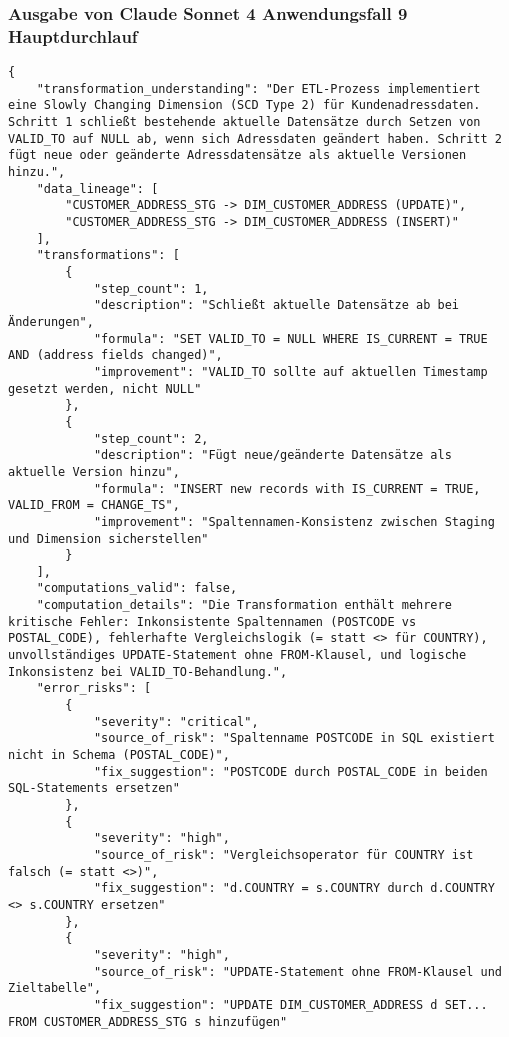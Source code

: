 \subsubsection{Ausgabe von Claude Sonnet 4 Anwendungsfall 9 Hauptdurchlauf}\label{anhang:subsubsec:claude_case9_prompt1}
\begin{lstlisting}[caption={Ausgabe: Claude Sonnet 4 Anwendungsfall 9 Hauptdurchlauf},label={claude_case9_prompt1}]
{
    "transformation_understanding": "Der ETL-Prozess implementiert eine Slowly Changing Dimension (SCD Type 2) für Kundenadressdaten. Schritt 1 schließt bestehende aktuelle Datensätze durch Setzen von VALID_TO auf NULL ab, wenn sich Adressdaten geändert haben. Schritt 2 fügt neue oder geänderte Adressdatensätze als aktuelle Versionen hinzu.",
    "data_lineage": [
        "CUSTOMER_ADDRESS_STG -> DIM_CUSTOMER_ADDRESS (UPDATE)",
        "CUSTOMER_ADDRESS_STG -> DIM_CUSTOMER_ADDRESS (INSERT)"
    ],
    "transformations": [
        {
            "step_count": 1,
            "description": "Schließt aktuelle Datensätze ab bei Änderungen",
            "formula": "SET VALID_TO = NULL WHERE IS_CURRENT = TRUE AND (address fields changed)",
            "improvement": "VALID_TO sollte auf aktuellen Timestamp gesetzt werden, nicht NULL"
        },
        {
            "step_count": 2,
            "description": "Fügt neue/geänderte Datensätze als aktuelle Version hinzu",
            "formula": "INSERT new records with IS_CURRENT = TRUE, VALID_FROM = CHANGE_TS",
            "improvement": "Spaltennamen-Konsistenz zwischen Staging und Dimension sicherstellen"
        }
    ],
    "computations_valid": false,
    "computation_details": "Die Transformation enthält mehrere kritische Fehler: Inkonsistente Spaltennamen (POSTCODE vs POSTAL_CODE), fehlerhafte Vergleichslogik (= statt <> für COUNTRY), unvollständiges UPDATE-Statement ohne FROM-Klausel, und logische Inkonsistenz bei VALID_TO-Behandlung.",
    "error_risks": [
        {
            "severity": "critical",
            "source_of_risk": "Spaltenname POSTCODE in SQL existiert nicht in Schema (POSTAL_CODE)",
            "fix_suggestion": "POSTCODE durch POSTAL_CODE in beiden SQL-Statements ersetzen"
        },
        {
            "severity": "high",
            "source_of_risk": "Vergleichsoperator für COUNTRY ist falsch (= statt <>)",
            "fix_suggestion": "d.COUNTRY = s.COUNTRY durch d.COUNTRY <> s.COUNTRY ersetzen"
        },
        {
            "severity": "high",
            "source_of_risk": "UPDATE-Statement ohne FROM-Klausel und Zieltabelle",
            "fix_suggestion": "UPDATE DIM_CUSTOMER_ADDRESS d SET... FROM CUSTOMER_ADDRESS_STG s hinzufügen"

\end{lstlisting}
